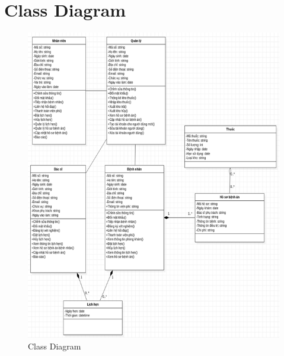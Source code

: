 \documentclass{report}
\begin{document}
\section{Class Diagram}
\begin{center}
	\begin{figure}[!htp]
		\begin{center}
			\includegraphics[scale=.9]{Hinh/Class diagram.png}
		\end{center}
		\caption{Class Diagram}
	\end{figure}
\end{center}

\pagebreak
\end{document}
